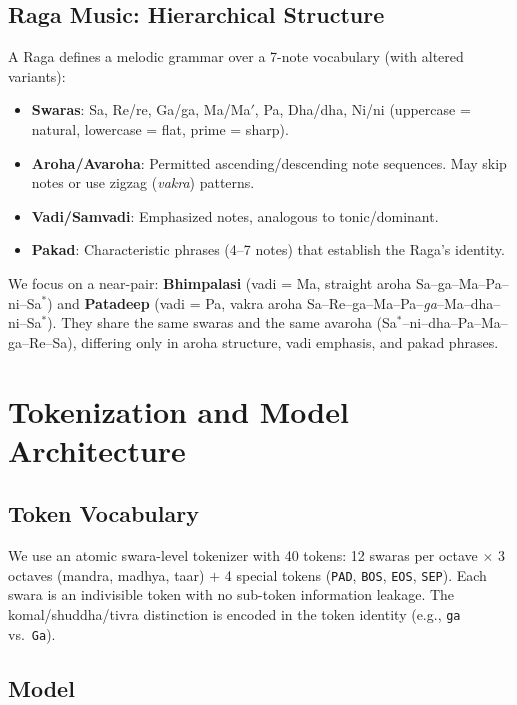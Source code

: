 \documentclass[11pt,a4paper]{article}
\begin{document}
\subsection{Raga Music: Hierarchical Structure}

A Raga defines a melodic grammar over a 7-note vocabulary (with altered variants):
\begin{itemize}[nosep]
    \item \textbf{Swaras}: Sa, Re/re, Ga/ga, Ma/Ma$'$, Pa, Dha/dha, Ni/ni (uppercase = natural, lowercase = flat, prime = sharp).
    \item \textbf{Aroha/Avaroha}: Permitted ascending/descending note sequences. May skip notes or use zigzag (\emph{vakra}) patterns.
    \item \textbf{Vadi/Samvadi}: Emphasized notes, analogous to tonic/dominant.
    \item \textbf{Pakad}: Characteristic phrases (4--7 notes) that establish the Raga's identity.
\end{itemize}

We focus on a near-pair: \textbf{Bhimpalasi} (vadi = Ma, straight aroha Sa--ga--Ma--Pa--ni--Sa$^*$) and \textbf{Patadeep} (vadi = Pa, vakra aroha Sa--Re--ga--Ma--Pa--\emph{ga}--Ma--dha--ni--Sa$^*$). They share the same swaras and the same avaroha (Sa$^*$--ni--dha--Pa--Ma--ga--Re--Sa), differing only in aroha structure, vadi emphasis, and pakad phrases.

\section{Tokenization and Model Architecture}

\subsection{Token Vocabulary}

We use an atomic swara-level tokenizer with 40 tokens: 12 swaras per octave $\times$ 3 octaves (mandra, madhya, taar) $+$ 4 special tokens (\texttt{PAD}, \texttt{BOS}, \texttt{EOS}, \texttt{SEP}). Each swara is an indivisible token with no sub-token information leakage. The komal/shuddha/tivra distinction is encoded in the token identity (e.g., \texttt{ga} vs.\ \texttt{Ga}).

\subsection{Model}
\end{document}
